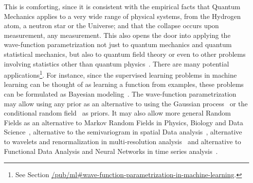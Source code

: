 \documentclass[11pt]{book}
\begin{document}
This is comforting, since it is consistent with the empirical facts that
Quantum Mechanics applies to a very wide range of physical systems, from
the Hydrogen atom, a neutron star or the Universe; and that the collapse
occurs upon measurement, any measurement. This also opens the door into
applying the wave-function parametrization not just to quantum mechanics
and quantum statistical mechanics, but also to quantum field theory or
even to other problems involving statistics other than quantum
physics~\cite{Bertin2016Statistical}.
There are many potential applications\footnote{See Section
  \url{/pub/ml\#wave-function-parametrization-in-machine-learning}.}.
For instance, since the supervised learning problems in machine learning
can be thought of as learning a function from examples, these problems
can be formulated as Bayesian
modeling~\cite{Rasmussen2006Gaussian}. The wave-function parametrization may allow using any prior
as an alternative to using the Gaussian
process~\cite{Rasmussen2006Gaussian} or the conditional random
field~\cite{Chatzis2013infinite} as priors. It may also allow more general Random Fields as an
alternative to Markov Random Fields in Physics, Biology and Data
Science~\cite{Hernuxe1ndez2021Random}, alternative to the semivariogram in spatial Data
analysis~\cite{Oliver2005Statistical}, alternative to wavelets and renormalization in
multi-resolution
analysis~\cite{Battle1999Wavelets} and
alternative to Functional Data Analysis and Neural Networks in time
series analysis~\cite{Perdices2021Deep}.
\end{document}
